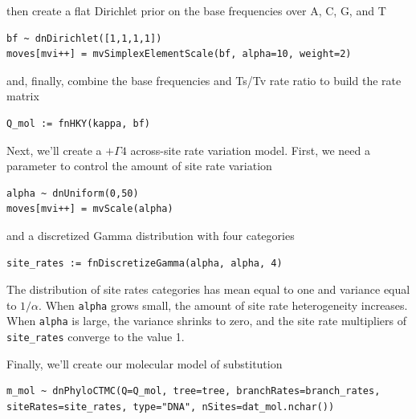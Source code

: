 then create a flat Dirichlet prior on the base frequencies over A, C, G, and T

\begin{snugshade}
\begin{lstlisting}
bf ~ dnDirichlet([1,1,1,1])
moves[mvi++] = mvSimplexElementScale(bf, alpha=10, weight=2)
\end{lstlisting}
\end{snugshade}

and, finally, combine the base frequencies and Ts/Tv rate ratio to build the rate matrix

\begin{snugshade}
\begin{lstlisting}
Q_mol := fnHKY(kappa, bf)
\end{lstlisting}
\end{snugshade}

Next, we'll create a $+\Gamma4$ across-site rate variation model.
First, we need a parameter to control the amount of site rate variation

\begin{snugshade}
\begin{lstlisting}
alpha ~ dnUniform(0,50)
moves[mvi++] = mvScale(alpha)
\end{lstlisting}
\end{snugshade}

and a discretized Gamma distribution with four categories

\begin{snugshade}
\begin{lstlisting}
site_rates := fnDiscretizeGamma(alpha, alpha, 4)
\end{lstlisting}
\end{snugshade}

The distribution of site rates categories has mean equal to one and variance equal to $1/\alpha$.
When {\tt alpha} grows small, the amount of site rate heterogeneity increases.
When {\tt alpha} is large, the variance shrinks to zero, and the site rate multipliers of {\tt site\_rates} converge to the value 1.

Finally, we'll create our molecular model of substitution

\begin{snugshade}
\begin{lstlisting}
m_mol ~ dnPhyloCTMC(Q=Q_mol, tree=tree, branchRates=branch_rates, siteRates=site_rates, type="DNA", nSites=dat_mol.nchar())
\end{lstlisting}
\end{snugshade}

